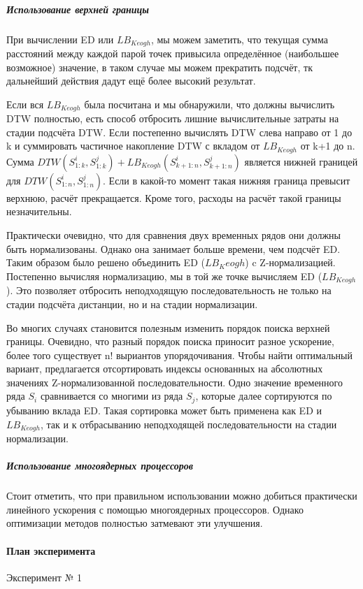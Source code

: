 \documentclass[12pt,twoside]{article}
\begin{document}
				\subparagraph{Использование верхней границы}
				При вычислении ED или $LB_{Keogh}$, мы можем заметить, что текущая сумма расстояний между каждой парой точек привысила определённое (наибольшее возможное) значение, в таком случае мы можем прекратить подсчёт, тк дальнейший действия дадут ещё более высокий результат.
				
				Если вся $LB_{Keogh}$ была посчитана и мы обнаружили, что должны вычислить DTW полностью, есть способ отбросить лишние вычислительные затраты на стадии подсчёта DTW. Если постепенно вычислять DTW слева направо от 1 до k и суммировать частичное накопление DTW с вкладом от $LB_{Keogh}$ от k+1 до n. Сумма $DTW(S_{1:k}^i, S_{1:k}^j) + LB_{Keogh}(S_{k+1:n}^i, S_{k+1:n}^j)$ является нижней границей для $DTW(S_{1:n}^i, S_{1:n}^j)$. Если в какой-то момент такая нижняя граница превысит верхнюю, расчёт прекращается. Кроме того, расходы на расчёт такой границы незначительны.
				
				Практически очевидно, что для сравнения двух временных рядов они должны быть нормализованы. Однако она занимает больше времени, чем подсчёт ED. Таким образом было решено объединить ED ($LB_Keogh$) c Z-нормализацией. Постепенно вычисляя нормализацию, мы в той же точке вычисляем ED ($LB_{Keogh}$). Это позволяет отбросить неподходящую последовательность не только на стадии подсчёта дистанции, но и на стадии нормализации.
				
				Во многих случаях становится полезным изменить порядок поиска верхней границы. Очевидно, что разный порядок поиска приносит разное ускорение, более того существует n! выриантов упорядочивания. Чтобы найти оптимальный вариант, предлагается отсортировать индексы основанных на абсолютных значениях Z-нормализованной последовательности. Одно значение временного ряда $S_i$ сравнивается со многими из ряда $S_j$, которые далее сортируются по убыванию вклада ED. Такая сортировка может быть применена как ED и $LB_{Keogh}$, так и к отбрасыванию неподходящей последовательности на стадии нормализации.
						
				\subparagraph{Использование многоядерных процессоров}
				Стоит отметить, что при правильном использовании можно добиться практически линейного ускорения с помощью многоядерных процессоров. Однако оптимизации методов полностью затмевают эти улучшения.
				
				\paragraph{План эксперимента}
						Эксперимент № 1
						
\end{document}

